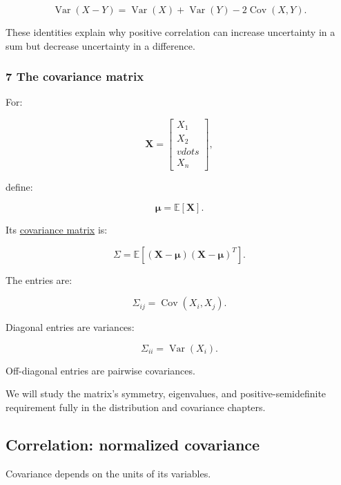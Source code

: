 \[
 \boxed{ \operatorname{Var}(X-Y) = \operatorname{Var}(X)+ \operatorname{Var}(Y)- 2\operatorname{Cov}(X,Y) }.
\]

These identities explain why positive correlation can increase uncertainty in a sum but decrease uncertainty in a difference.

\subsubsection{7 The covariance matrix}\label{02-foundations-ii-ch023-the-covariance-matrix}

\hypertarget{02-foundations-ii-ch023-the-covariance-matrix}{}

For:

\[
 \mathbf X= \begin{bmatrix}X_1\\X_2\\vdots\\X_n\end{bmatrix},
\]

define:

\[
 \boldsymbol\mu=\mathbb E[\mathbf X].
\]

Its \hyperref[02-foundations-ii-ch023-expected-values-describe-centers-covariance-describes-dependence]{covariance matrix} is:

\[
 \boxed{ \Sigma= \mathbb E[ (\mathbf X-\boldsymbol\mu) (\mathbf X-\boldsymbol\mu)^T ] }.
\]

The entries are:

\[
 \Sigma_{ij}=\operatorname{Cov}(X_i,X_j).
\]

Diagonal entries are variances:

\[
 \Sigma_{ii}=\operatorname{Var}(X_i).
\]

Off-diagonal entries are pairwise covariances.

We will study the matrix's symmetry, eigenvalues, and positive-semidefinite requirement fully in the distribution and covariance chapters.

\subsection{Correlation: normalized covariance}\label{02-foundations-ii-ch023-correlation-normalized-covariance}

\hypertarget{02-foundations-ii-ch023-correlation-normalized-covariance}{}

Covariance depends on the units of its variables.

